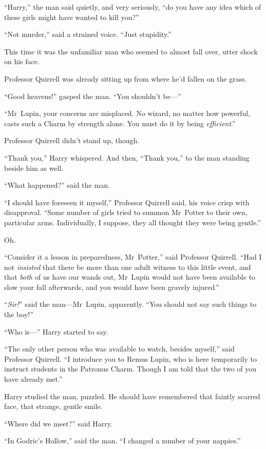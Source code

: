 “Harry,” the man said quietly, and very seriously, “do you have any idea which of these girls might have wanted to kill you?”

“Not murder,” said a strained voice.
“Just stupidity.”

This time it was the unfamiliar man who seemed to almost fall over, utter shock on his face.

Professor Quirrell was already sitting up from where he’d fallen on the grass.

“Good heavens!” gasped the man.
“You shouldn’t be—”

“Mr~Lupin, your concerns are misplaced. No wizard, no matter how powerful, casts such a Charm by strength alone. You must do it by being \emph{efficient}.”

Professor Quirrell didn’t stand up, though.

“Thank you,” Harry whispered. And then,
“Thank you,” to the man standing beside him as well.

“What happened?” said the man.

“I should have foreseen it myself,” Professor Quirrell said, his voice crisp with disapproval.
“Some number of girls tried to summon Mr~Potter to their own, particular arms. Individually, I suppose, they all thought they were being gentle.”

Oh.

“Consider it a lesson in preparedness, Mr~Potter,” said Professor Quirrell.
“Had I not \emph{insisted} that there be more than one adult witness to this little event, and that \emph{both} of us have our wands out, Mr~Lupin would not have been available to slow your fall afterwards, and you would have been gravely injured.”

“\emph{Sir!}” said the man—Mr~Lupin, apparently.
“You should not say such things to the boy!”

“Who is—” Harry started to say.

“The only other person who was available to watch, besides myself,” said Professor Quirrell.
“I introduce you to Remus Lupin, who is here temporarily to instruct students in the Patronus Charm. Though I am told that the two of you have already met.”

Harry studied the man, puzzled. He should have remembered that faintly scarred face, that strange, gentle smile.

“Where did we meet?” said Harry.

“In Godric’s Hollow,” said the man.
“I changed a number of your nappies.”


